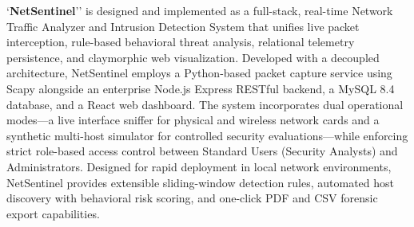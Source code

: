 \documentclass[a4paper,12pt]{report}
\begin{document}
	`\textbf{NetSentinel}'' is designed and implemented as a full-stack, real-time Network Traffic Analyzer and Intrusion Detection System that unifies live packet interception, rule-based behavioral threat analysis, relational telemetry persistence, and claymorphic web visualization. Developed with a decoupled architecture, NetSentinel employs a Python-based packet capture service using Scapy alongside an enterprise Node.js Express RESTful backend, a MySQL 8.4 database, and a React web dashboard. The system incorporates dual operational modes—a live interface sniffer for physical and wireless network cards and a synthetic multi-host simulator for controlled security evaluations—while enforcing strict role-based access control between Standard Users (Security Analysts) and Administrators. Designed for rapid deployment in local network environments, NetSentinel provides extensible sliding-window detection rules, automated host discovery with behavioral risk scoring, and one-click PDF and CSV forensic export capabilities.
	
\end{document}
